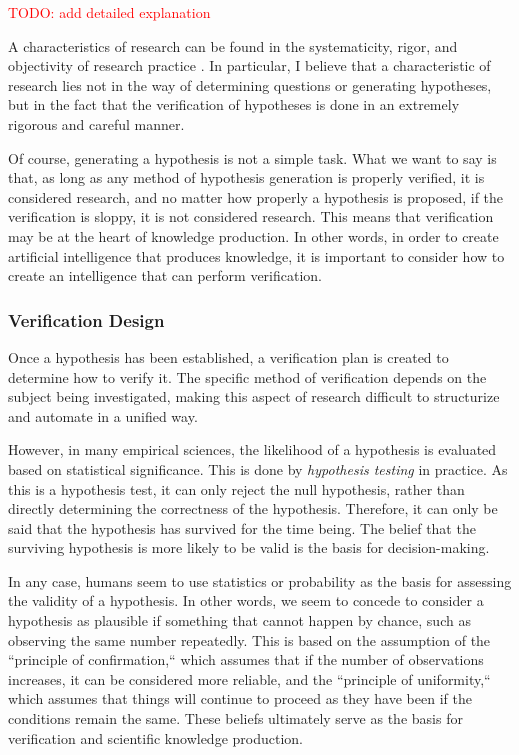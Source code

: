 \documentclass{book}
\begin{document}
\textcolor{red}{TODO: add detailed explanation}

A characteristics of research can be found in the systematicity, rigor, and objectivity of research practice \cite{sep-scientific-method,hoyningen2008systematicity,haack2003defending}. In particular, I believe that a characteristic of research lies not in the way of determining questions or generating hypotheses, but in the fact that the verification of hypotheses is done in an extremely rigorous and careful manner. 


Of course, generating a hypothesis is not a simple task. What we want to say is that, as long as any method of hypothesis generation is properly verified, it is considered research, and no matter how properly a hypothesis is proposed, if the verification is sloppy, it is not considered research. This means that verification may be at the heart of knowledge production. In other words, in order to create artificial intelligence that produces knowledge, it is important to consider how to create an intelligence that can perform verification.

\subsubsection{Verification Design}
Once a hypothesis has been established, a verification plan is created to determine how to verify it. The specific method of verification depends on the subject being investigated, making this aspect of research difficult to structurize and automate in a unified way.

However, in many empirical sciences, the likelihood of a hypothesis is evaluated based on statistical significance. This is done by \textit{hypothesis testing} in practice. As this is a hypothesis test, it can only reject the null hypothesis, rather than directly determining the correctness of the hypothesis. Therefore, it can only be said that the hypothesis has survived for the time being. The belief that the surviving hypothesis is more likely to be valid is the basis for decision-making.

In any case, humans seem to use statistics or probability as the basis for assessing the validity of a hypothesis. In other words, we seem to concede to consider a hypothesis as plausible if something that cannot happen by chance, such as observing the same number repeatedly. This is based on the assumption of the ``principle of confirmation,`` which assumes that if the number of observations increases, it can be considered more reliable, and the ``principle of uniformity,`` which assumes that things will continue to proceed as they have been if the conditions remain the same. These beliefs ultimately serve as the basis for verification and scientific knowledge production. 
\end{document}
